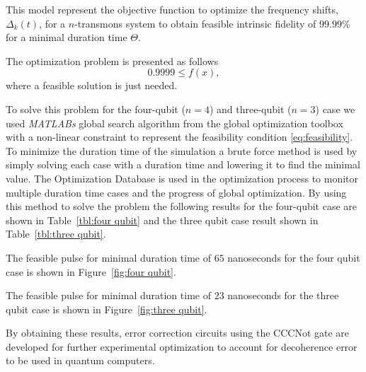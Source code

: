 This model represent the objective function to optimize the frequency shifts, $\Delta_k(t)$, for a $n$-transmons system to obtain feasible intrinsic fidelity of $99.99\%$ for a minimal duration time $\Theta$.

The optimization problem is presented as follows
\begin{equation}
    \label{eq:feasibility}
    0.9999 \leq f(x),
\end{equation}
where a feasible solution is just needed. 

To solve this problem for the four-qubit ($n=4$) and three-qubit ($n=3$) case we used \textit{MATLABs} global search algorithm from the global optimization toolbox with a non-linear constraint to represent the feasibility condition \eqref{eq:feasibility}. To minimize the duration time of the simulation a brute force method is used by simply solving each case with a duration time and lowering it to find the minimal value. The Optimization Database is used in the optimization process to
monitor multiple duration time cases and the progress of global optimization. By using this method to solve the problem the following results for the four-qubit case are shown in Table~\ref{tbl:four qubit} and the three qubit case result shown in Table~\ref{tbl:three qubit}. 



The feasible pulse for minimal duration time of $65$ nanoseconds for the four qubit case is shown in Figure~\ref{fig:four qubit}.


The feasible pulse for minimal duration time of $23$ nanoseconds for the three qubit case is shown in Figure~\ref{fig:three qubit}.


By obtaining these results, error correction circuits using the CCCNot gate are developed for further experimental optimization to account for decoherence error to be used in quantum computers.
